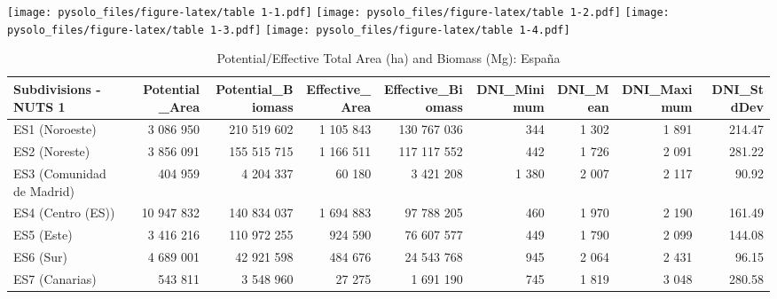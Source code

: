 \documentclass[
  a4paper]{article}
\begin{document}
\texttt{[image: pysolo\_files/figure-latex/table 1-1.pdf]} \pagebreak
\texttt{[image: pysolo\_files/figure-latex/table 1-2.pdf]} \pagebreak
\texttt{[image: pysolo\_files/figure-latex/table 1-3.pdf]} \pagebreak
\texttt{[image: pysolo\_files/figure-latex/table 1-4.pdf]} \pagebreak

\begin{table}

\caption{\label{tab:table 1}Potential/Effective Total Area (ha) and Biomass (Mg): España}
\centering
\begin{tabular}[t]{lrrrrrrrr}
\toprule
Subdivisions - NUTS 1 & Potential\_Area & Potential\_Biomass & Effective\_Area & Effective\_Biomass & DNI\_Minimum & DNI\_Mean & DNI\_Maximum & DNI\_StdDev\\
\midrule
ES1 (Noroeste) & 3 086 950 & 210 519 602 & 1 105 843 & 130 767 036 & 344 & 1 302 & 1 891 & 214.47\\
ES2 (Noreste) & 3 856 091 & 155 515 715 & 1 166 511 & 117 117 552 & 442 & 1 726 & 2 091 & 281.22\\
ES3 (Comunidad de Madrid) & 404 959 & 4 204 337 & 60 180 & 3 421 208 & 1 380 & 2 007 & 2 117 & 90.92\\
ES4 (Centro (ES)) & 10 947 832 & 140 834 037 & 1 694 883 & 97 788 205 & 460 & 1 970 & 2 190 & 161.49\\
ES5 (Este) & 3 416 216 & 110 972 255 & 924 590 & 76 607 577 & 449 & 1 790 & 2 099 & 144.08\\
\addlinespace
ES6 (Sur) & 4 689 001 & 42 921 598 & 484 676 & 24 543 768 & 945 & 2 064 & 2 431 & 96.15\\
ES7 (Canarias) & 543 811 & 3 548 960 & 27 275 & 1 691 190 & 745 & 1 819 & 3 048 & 280.58\\
\bottomrule
\end{tabular}
\end{table}
\end{document}

